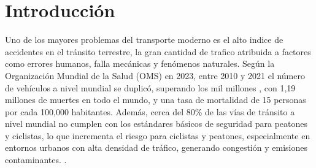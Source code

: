\documentclass[conference]{IEEEtran}
\begin{document}
\section{Introducción}
Uno de los mayores problemas del transporte moderno es el alto indice de accidentes en el tránsito terrestre, la gran cantidad de trafico atribuida a factores como errores humanos, falla mecánicas y fenómenos naturales. Según la Organización Mundial de la Salud (OMS) en 2023, entre 2010 y 2021 el número de vehículos a nivel mundial se duplicó, superando los mil millones \cite{Accidentes}, con 1,19 millones de muertes en todo el mundo, y una tasa de mortalidad de 15 personas por cada 100,000 habitantes. Además, cerca del 80\% de las vías de tránsito a nivel mundial no cumplen con los estándares básicos de seguridad para peatones y ciclistas, lo que incrementa el riesgo para ciclistas y peatones, especialmente en entornos urbanos con alta densidad de tráfico, generando congestión y emisiones contaminantes. \cite{montezuma2008derecho, diaz2015infraestructuras}.

\end{document}
